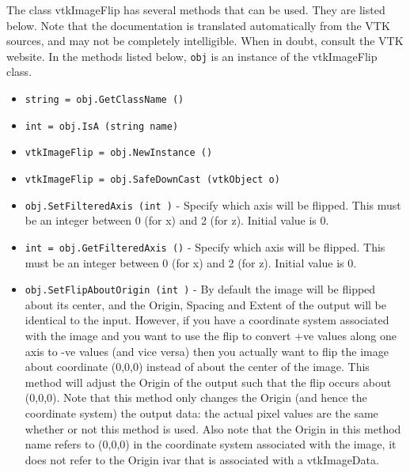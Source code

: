 The class vtkImageFlip has several methods that can be used.
  They are listed below.
Note that the documentation is translated automatically from the VTK sources,
and may not be completely intelligible.  When in doubt, consult the VTK website.
In the methods listed below, \verb|obj| is an instance of the vtkImageFlip class.
\begin{itemize}
\item  \verb|string = obj.GetClassName ()|

\item  \verb|int = obj.IsA (string name)|

\item  \verb|vtkImageFlip = obj.NewInstance ()|

\item  \verb|vtkImageFlip = obj.SafeDownCast (vtkObject o)|

\item  \verb|obj.SetFilteredAxis (int )| -  Specify which axis will be flipped.  This must be an integer
 between 0 (for x) and 2 (for z). Initial value is 0.

\item  \verb|int = obj.GetFilteredAxis ()| -  Specify which axis will be flipped.  This must be an integer
 between 0 (for x) and 2 (for z). Initial value is 0.

\item  \verb|obj.SetFlipAboutOrigin (int )| -  By default the image will be flipped about its center, and the
 Origin, Spacing and Extent of the output will be identical to
 the input.  However, if you have a coordinate system associated
 with the image and you want to use the flip to convert +ve values
 along one axis to -ve values (and vice versa) then you actually
 want to flip the image about coordinate (0,0,0) instead of about
 the center of the image.  This method will adjust the Origin of
 the output such that the flip occurs about (0,0,0).  Note that
 this method only changes the Origin (and hence the coordinate system)
 the output data: the actual pixel values are the same whether or not
 this method is used.  Also note that the Origin in this method name
 refers to (0,0,0) in the coordinate system associated with the image,
 it does not refer to the Origin ivar that is associated with a
 vtkImageData.


\end{itemize}
